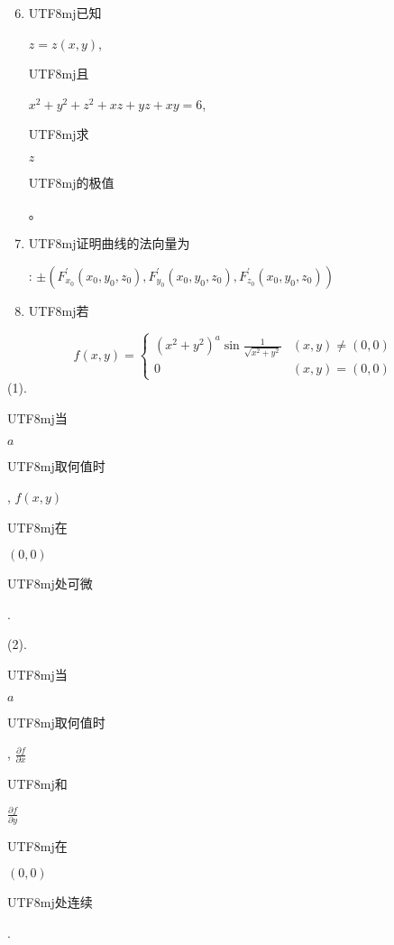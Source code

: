 \documentclass[10pt]{article}
\begin{document}
\begin{enumerate}
  \setcounter{enumi}{5}
  \item \begin{CJK}{UTF8}{mj}已知\end{CJK} $z=z(x, y)$, \begin{CJK}{UTF8}{mj}且\end{CJK} $x^{2}+y^{2}+z^{2}+x z+y z+x y=6$, \begin{CJK}{UTF8}{mj}求\end{CJK} $z$ \begin{CJK}{UTF8}{mj}的极值\end{CJK}。

  \item \begin{CJK}{UTF8}{mj}证明曲线的法向量为\end{CJK}: $\pm\left(F_{x_{0}}^{\prime}\left(x_{0}, y_{0}, z_{0}\right), F_{y_{0}}^{\prime}\left(x_{0}, y_{0}, z_{0}\right), F_{z_{0}}^{\prime}\left(x_{0}, y_{0}, z_{0}\right)\right)$

  \item \begin{CJK}{UTF8}{mj}若\end{CJK}

\end{enumerate}
$$
f(x, y)= \begin{cases}\left(x^{2}+y^{2}\right)^{a} \sin \frac{1}{\sqrt{x^{2}+y^{2}}} & (x, y) \neq(0,0) \\ 0 & (x, y)=(0,0)\end{cases}
$$
(1). \begin{CJK}{UTF8}{mj}当\end{CJK} $a$ \begin{CJK}{UTF8}{mj}取何值时\end{CJK}, $f(x, y)$ \begin{CJK}{UTF8}{mj}在\end{CJK} $(0,0)$ \begin{CJK}{UTF8}{mj}处可微\end{CJK}.

(2). \begin{CJK}{UTF8}{mj}当\end{CJK} $a$ \begin{CJK}{UTF8}{mj}取何值时\end{CJK}, $\frac{\partial f}{\partial x}$ \begin{CJK}{UTF8}{mj}和\end{CJK} $\frac{\partial f}{\partial y}$ \begin{CJK}{UTF8}{mj}在\end{CJK} $(0,0)$ \begin{CJK}{UTF8}{mj}处连续\end{CJK}.
\end{document}
